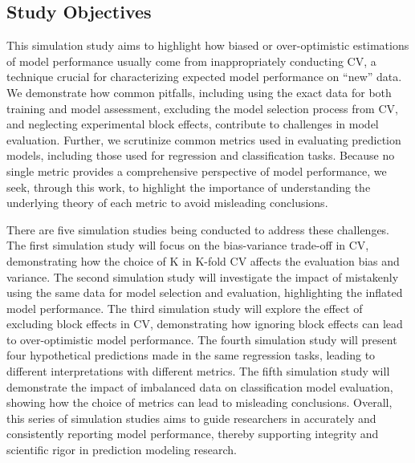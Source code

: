\subsection{Study Objectives}

This simulation study aims to highlight how biased or over-optimistic estimations of model performance usually come from inappropriately conducting CV, a technique crucial for characterizing expected model performance on “new” data. We demonstrate how common pitfalls, including using the exact data for both training and model assessment, excluding the model selection process from CV, and neglecting experimental block effects, contribute to challenges in model evaluation. Further, we scrutinize common metrics used in evaluating prediction models, including those used for regression and classification tasks. Because no single metric provides a comprehensive perspective of model performance, we seek, through this work, to highlight the importance of understanding the underlying theory of each metric to avoid misleading conclusions.

There are five simulation studies being conducted to address these challenges. The first simulation study will focus on the bias-variance trade-off in CV, demonstrating how the choice of K in K-fold CV affects the evaluation bias and variance. The second simulation study will investigate the impact of mistakenly using the same data for model selection and evaluation, highlighting the inflated model performance. The third simulation study will explore the effect of excluding block effects in CV, demonstrating how ignoring block effects can lead to over-optimistic model performance. The fourth simulation study will present four hypothetical predictions made in the same regression tasks, leading to different interpretations with different metrics. The fifth simulation study will demonstrate the impact of imbalanced data on classification model evaluation, showing how the choice of metrics can lead to misleading conclusions. Overall, this series of simulation studies aims to guide researchers in accurately and consistently reporting model performance, thereby supporting integrity and scientific rigor in prediction modeling research.
